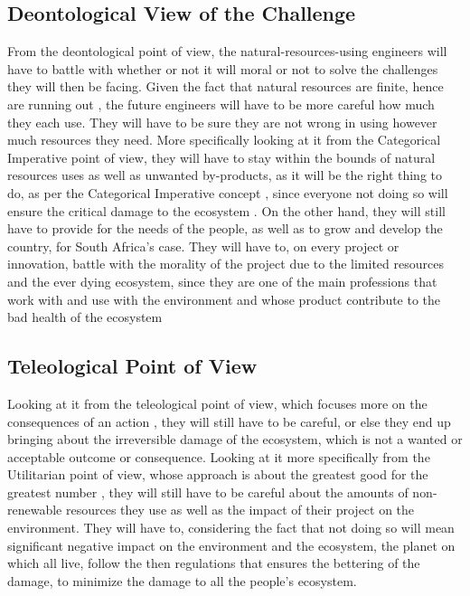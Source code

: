\documentclass[12pt]{witseiepaper}
\begin{document}
    \subsection{Deontological View of the Challenge} 

    From the deontological point of view, the natural-resources-using engineers will have to battle with whether or not it will moral or not to solve the challenges they will then be facing. Given the fact that natural resources are finite, hence are running out \cite{subramanian2018crisis}, the future engineers will have to be more careful how much they each use. They will have to be sure they are not wrong in using however much resources they need. More specifically looking at it from the Categorical Imperative point of view, they will have to stay within the bounds of natural resources uses as well as unwanted by-products, as it will be the right thing to do, as per the Categorical Imperative concept \cite{basara2018kant}, since everyone not doing so will ensure the critical damage to the ecosystem \cite{appannagari2017environmental}. On the other hand, they will still have to provide for the needs of the people, as well as to grow and develop the country, for South Africa’s case. They will have to, on every project or innovation, battle with the morality of the project due to the limited resources and the ever dying ecosystem, since they are one of the main professions that work with and use with the environment and whose product contribute to the bad health of the ecosystem  

    \subsection{Teleological Point of View} 

    Looking at it from the teleological point of view, which focuses more on the consequences of an action \cite{ismail2018narrative}, they will still have to be careful, or else they end up bringing about the irreversible damage of the ecosystem, which is not a wanted or acceptable outcome or consequence. Looking at it more specifically from the Utilitarian point of view, whose approach is about the greatest good for the greatest number \cite{ismail2018narrative}, they will still have to be careful about the amounts of non-renewable resources they use as well as the impact of their project on the environment. They will have to, considering the fact that not doing so will mean significant negative impact on the environment and the ecosystem, the planet on which all live, follow the then regulations that ensures the bettering of the damage, to minimize the damage to all the people’s ecosystem.
\end{document}

